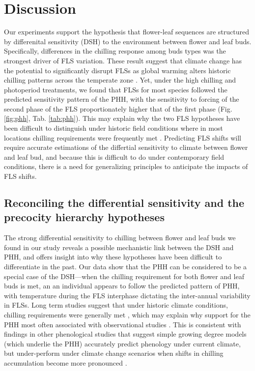\documentclass[11pt]{article}\usepackage[]{graphicx}\usepackage[]{color}
\begin{document}
\section*{Discussion}
\noindent Our experiments support the hypothesis that flower-leaf sequences are structured by differenital sensitivity (DSH) to the environment between flower and leaf buds. Specifically, differences in the chilling response among buds types was the strongest driver of FLS variation. These result suggest that climate change has the potential to significantly disrupt FLSs as global warming alters historic chilling patterns across the temperate zone \citep{Morin:2009aa}. Yet, under the high chilling and photoperiod treatments, we found that FLSs for most species followed the predicted sensitivity pattern of the PHH, with the sensitivity to forcing of the second phase of the FLS proportionately higher that of the first phase (Fig.\ref{fig:phh}, Tab. \ref{tab:phh}). This may explain why the two FLS hypotheses have been difficult to distinguish under historic field conditions where in most locations chilling requirements were frequently met \citep{Gauzere2019}. 
Predicting FLS shifts will require accurate estimations of the differtial sensitivity to climate between flower and leaf bud, and because this is difficult to do under contemporary field conditions, there is a need for generalizing principles to anticipate the impacts of FLS shifts.\\%

\subsection*{Reconciling the differential sensitivity and the precocity hierarchy hypotheses}

\noindent The strong differential sensitivity to chilling between flower and leaf buds we found in our study reveals a possible mechanistic link between the DSH and PHH, and offers insight into why these hypotheses have been difficult to differentiate in the past. Our data show that the PHH can be considered to be a special case of the DSH---when the chilling requirement for both flower and leaf buds is met, an an individual appears to follow the predicted pattern of PHH, with temperature during the FLS interphase dictating the inter-annual variability in FLSs. Long term studies suggest that under historic climate conditions, chilling requirements were generally met \citep{Gauzere2019,Chuine:2016aa}, which may explain why support for the PHH most often associated with observational studies \citep[e.g.][]{COSMULESCU:2020aa,Guo2014}. This is consistent with findings in other phenological studies that suggest simple growing degree models (which underlie the PHH) accurately predict phenology under current climate, but under-perform under climate change scenarios when shifts in chilling accumulation become more pronounced \citep{Linkosalo2008,Chuine:2016aa}.\\ 
\end{document}
